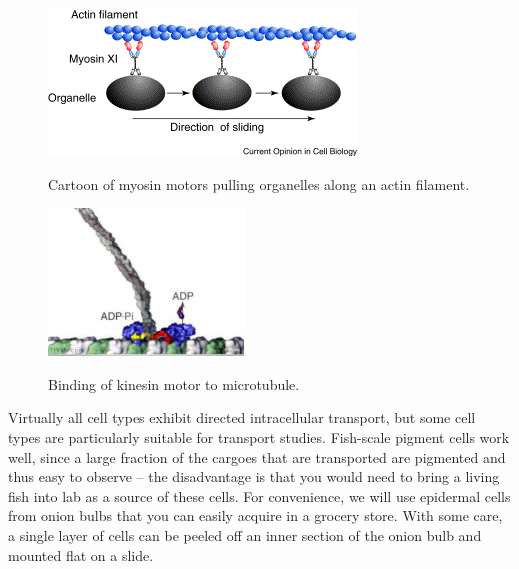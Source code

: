 \documentclass{../lab}
\begin{document}
\begin{figure}[h]
\begin{minipage}[t]{.475\textwidth}
    \centering
    \href{http://experimentationlab.berkeley.edu/sites/default/files/images/Myosin.gif}{\includegraphics[width=\linewidth,keepaspectratio]{images/Myosin.png}}
    \caption{Cartoon of myosin motors pulling organelles along an actin filament.}
\end{minipage}\hfill
\begin{minipage}[t]{.475\textwidth}
    \centering
    \href{http://experimentationlab.berkeley.edu/sites/default/files/images/196px-Kinesin.jpg}{\includegraphics[width=\linewidth,keepaspectratio]{images/196px-Kinesin.jpg}}
    \caption{Binding of kinesin motor to microtubule.}
\end{minipage}
\end{figure}

Virtually all cell types exhibit directed intracellular transport, but some cell types are particularly suitable for transport studies. Fish-scale pigment cells work well, since a large fraction of the cargoes that are transported are pigmented and thus easy to observe – the disadvantage is that you would need to bring a living fish into lab as a source of these cells. For convenience, we will use epidermal cells from onion bulbs that you can easily acquire in a grocery store. With some care, a single layer of cells can be peeled off an inner section of the onion bulb and mounted flat on a slide.
\end{document}
